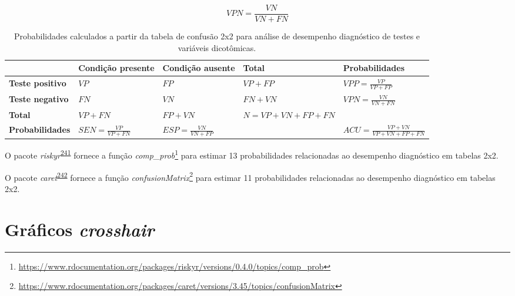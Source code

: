 \documentclass[
  a4paper,
]{book}
\renewcommand{\href}[2]{#2\footnote{\url{#1}}}
\newenvironment{infobox}[1]
  {
  \begin{itemize}
  \renewcommand{\labelitemi}{
    \raisebox{-.7\height}[0pt][0pt]{
      {\setkeys{Gin}{width=3em,keepaspectratio}
        \texttt{[image: \#1]}}
    }
  }
  \setlength{\fboxsep}{1em}
  \begin{blackbox}
  \item
  }
  {
  \end{blackbox}
  \end{itemize}
  }
\begin{document}
\begin{equation}
\label{eq:vpn}
VPN = \dfrac{VN}{VN+FN}
\end{equation}

\begin{table}

\caption{\label{tab:crosstable-prob}Probabilidades calculados a partir da tabela de confusão 2x2 para análise de desempenho diagnóstico de testes e variáveis dicotômicas.}
\centering
\begin{tabu} to 
\toprule
\textbf{ } & \textbf{Condição presente} & \textbf{Condição ausente} & \textbf{Total} & \textbf{Probabilidades}\\
\midrule
\textbf{Teste positivo} & $VP$ & $FP$ & $VP+FP$ & $VPP = \frac{VP}{VP+FP}$\\
\textbf{Teste negativo} & $FN$ & $VN$ & $FN+VN$ & $VPN = \frac{VN}{VN+FN}$\\
\textbf{Total} & $VP+FN$ & $FP+VN$ & $N=VP+VN+FP+FN$ & \\
\textbf{Probabilidades} & $SEN = \frac{VP}{VP+FN}$ & $ESP = \frac{VN}{VN+FP}$ &  & $ACU = \frac{VP+VN}{VP+VN+FP+FN}$\\
\bottomrule
\end{tabu}
\end{table}

\begin{infobox}{images/Rlogo}
O pacote \emph{riskyr}\textsuperscript{\protect\hyperlink{ref-riskyr}{241}} fornece a função \href{https://www.rdocumentation.org/packages/riskyr/versions/0.4.0/topics/comp_prob}{\emph{comp\_prob}} para estimar 13 probabilidades relacionadas ao desempenho diagnóstico em tabelas 2x2.

\end{infobox}

\begin{infobox}{images/Rlogo}
O pacote \emph{caret}\textsuperscript{\protect\hyperlink{ref-caret}{242}} fornece a função \href{https://www.rdocumentation.org/packages/caret/versions/3.45/topics/confusionMatrix}{\emph{confusionMatrix}} para estimar 11 probabilidades relacionadas ao desempenho diagnóstico em tabelas 2x2.

\end{infobox}

\hypertarget{graficos-crosshair}{%
\section{\texorpdfstring{Gráficos \emph{crosshair}}{Gráficos crosshair}}\label{graficos-crosshair}}
\end{document}
